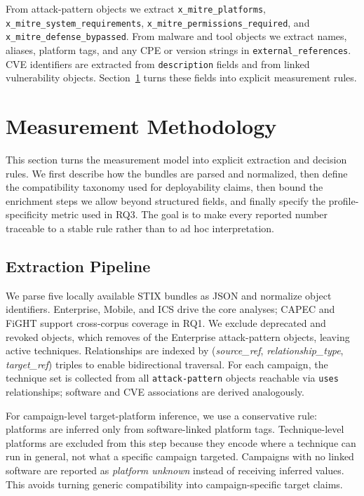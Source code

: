 \documentclass[sigconf]{acmart}
\newcommand{\stix}{STIX\xspace}
\begin{document}
From attack-pattern objects we extract \nolinkurl{x_mitre_platforms}, \nolinkurl{x_mitre_system_requirements}, \nolinkurl{x_mitre_permissions_required}, and \nolinkurl{x_mitre_defense_bypassed}. From malware and tool objects we extract names, aliases, platform tags, and any CPE or version strings in \nolinkurl{external_references}. CVE identifiers are extracted from \nolinkurl{description} fields and from linked vulnerability objects. Section~\ref{sec:methodology} turns these fields into explicit measurement rules.


\section{Measurement Methodology}\label{sec:methodology}

This section turns the measurement model into explicit extraction and decision rules. We first describe how the bundles are parsed and normalized, then define the compatibility taxonomy used for deployability claims, then bound the enrichment steps we allow beyond structured fields, and finally specify the profile-specificity metric used in RQ3. The goal is to make every reported number traceable to a stable rule rather than to ad hoc interpretation.

\subsection{Extraction Pipeline}

We parse five locally available \stix{} bundles as JSON and normalize object identifiers. Enterprise, Mobile, and ICS drive the core analyses; CAPEC and FiGHT support cross-corpus coverage in RQ1. We exclude deprecated and revoked objects, which removes \enterprisedeprecatedattackpatterncount{} of the \enterprisetotalattackpatterncount{} Enterprise attack-pattern objects, leaving \enterpriseplatformcount{} active techniques. Relationships are indexed by (\textit{source\_ref}, \textit{relationship\_type}, \textit{target\_ref}) triples to enable bidirectional traversal. For each campaign, the technique set is collected from all \texttt{attack-pattern} objects reachable via \texttt{uses} relationships; software and CVE associations are derived analogously.

For campaign-level target-platform inference, we use a conservative rule: platforms are inferred only from software-linked platform tags. Technique-level platforms are excluded from this step because they encode where a technique can run in general, not what a specific campaign targeted. Campaigns with no linked software are reported as \emph{platform unknown} instead of receiving inferred values. This avoids turning generic compatibility into campaign-specific target claims.
\end{document}
